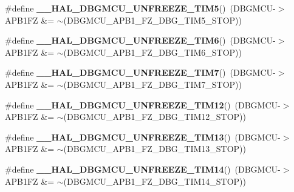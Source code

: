 \begin{DoxyCompactItemize}
\item 
\mbox{\label{group___h_a_l___exported___macros_ga0669527789fb4616ec07ed711a600d04}} 
\#define {\bfseries \+\_\+\+\_\+\+H\+A\+L\+\_\+\+D\+B\+G\+M\+C\+U\+\_\+\+U\+N\+F\+R\+E\+E\+Z\+E\+\_\+\+T\+I\+M5}()~(D\+B\+G\+M\+CU-\/$>$A\+P\+B1\+FZ \&= $\sim$(D\+B\+G\+M\+C\+U\+\_\+\+A\+P\+B1\+\_\+\+F\+Z\+\_\+\+D\+B\+G\+\_\+\+T\+I\+M5\+\_\+\+S\+T\+OP))
\item 
\mbox{\label{group___h_a_l___exported___macros_gaab127b51706a565b72c397e29b145234}} 
\#define {\bfseries \+\_\+\+\_\+\+H\+A\+L\+\_\+\+D\+B\+G\+M\+C\+U\+\_\+\+U\+N\+F\+R\+E\+E\+Z\+E\+\_\+\+T\+I\+M6}()~(D\+B\+G\+M\+CU-\/$>$A\+P\+B1\+FZ \&= $\sim$(D\+B\+G\+M\+C\+U\+\_\+\+A\+P\+B1\+\_\+\+F\+Z\+\_\+\+D\+B\+G\+\_\+\+T\+I\+M6\+\_\+\+S\+T\+OP))
\item 
\mbox{\label{group___h_a_l___exported___macros_ga4a6c5081b976583921ac5d140e15bb85}} 
\#define {\bfseries \+\_\+\+\_\+\+H\+A\+L\+\_\+\+D\+B\+G\+M\+C\+U\+\_\+\+U\+N\+F\+R\+E\+E\+Z\+E\+\_\+\+T\+I\+M7}()~(D\+B\+G\+M\+CU-\/$>$A\+P\+B1\+FZ \&= $\sim$(D\+B\+G\+M\+C\+U\+\_\+\+A\+P\+B1\+\_\+\+F\+Z\+\_\+\+D\+B\+G\+\_\+\+T\+I\+M7\+\_\+\+S\+T\+OP))
\item 
\mbox{\label{group___h_a_l___exported___macros_gaa8e882be8db24537679bc0d4a129f448}} 
\#define {\bfseries \+\_\+\+\_\+\+H\+A\+L\+\_\+\+D\+B\+G\+M\+C\+U\+\_\+\+U\+N\+F\+R\+E\+E\+Z\+E\+\_\+\+T\+I\+M12}()~(D\+B\+G\+M\+CU-\/$>$A\+P\+B1\+FZ \&= $\sim$(D\+B\+G\+M\+C\+U\+\_\+\+A\+P\+B1\+\_\+\+F\+Z\+\_\+\+D\+B\+G\+\_\+\+T\+I\+M12\+\_\+\+S\+T\+OP))
\item 
\mbox{\label{group___h_a_l___exported___macros_ga00b605f660d43ab1b833926dabe352fe}} 
\#define {\bfseries \+\_\+\+\_\+\+H\+A\+L\+\_\+\+D\+B\+G\+M\+C\+U\+\_\+\+U\+N\+F\+R\+E\+E\+Z\+E\+\_\+\+T\+I\+M13}()~(D\+B\+G\+M\+CU-\/$>$A\+P\+B1\+FZ \&= $\sim$(D\+B\+G\+M\+C\+U\+\_\+\+A\+P\+B1\+\_\+\+F\+Z\+\_\+\+D\+B\+G\+\_\+\+T\+I\+M13\+\_\+\+S\+T\+OP))
\item 
\mbox{\label{group___h_a_l___exported___macros_gaa62a0abc610b769d15fd9d20bdc14cd7}} 
\#define {\bfseries \+\_\+\+\_\+\+H\+A\+L\+\_\+\+D\+B\+G\+M\+C\+U\+\_\+\+U\+N\+F\+R\+E\+E\+Z\+E\+\_\+\+T\+I\+M14}()~(D\+B\+G\+M\+CU-\/$>$A\+P\+B1\+FZ \&= $\sim$(D\+B\+G\+M\+C\+U\+\_\+\+A\+P\+B1\+\_\+\+F\+Z\+\_\+\+D\+B\+G\+\_\+\+T\+I\+M14\+\_\+\+S\+T\+OP))

\end{DoxyCompactItemize}
